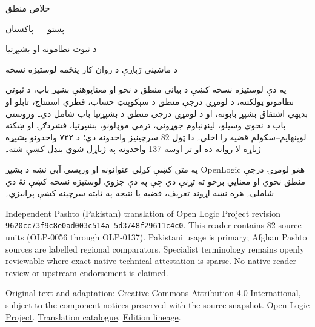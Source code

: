 \documentclass[12pt,a4paper,oneside]{report}
\theoremstyle{definition}
\begin{document}
\setRTL
\begin{titlepage}
\thispagestyle{empty}
\begin{center}
\vspace*{24mm}
{\Huge خلاص منطق}\par\bigskip
{\Large پښتو — پاکستان}\par\bigskip
{\LARGE د ثبوت نظامونه او بشپړتيا}\par\bigskip
د ماشيني ژباړې د روان کار پنځمه لوستيزه نسخه
\end{center}
\bigskip
په دې لوستيزه نسخه کښې د بياني منطق د نحو او معناپوهنې بشپړ باب،
د ثبوتي نظامونو ټولکتنه، د لومړۍ درجې منطق د سېکوېنټ حساب، فطري
استنتاج، تابلو او بديهي اشتقاق بشپړ بابونه، او د لومړۍ درجې منطق د
بشپړتيا باب شامل دي۔ وروستی باب د نحوي وسيلو، لينډنباوم جوړونې، ترمي
موډلونو، بشپړتيا، فشردګۍ او ښکته لوېنهايم–سکولم قضيه را اخلي۔ دا ټول
82 سرچينيز واحدونه دي؛ د ۷۲۲ واحدونو بشپړه ژباړه لا
روانه ده او تر اوسه 137 واحدونه په ژباړل شوي بنډل کښې
شته۔

په متن کښې کږلي عنوانونه او ورپسې آبي \LR{\latinfont [OLP]} نښه د
بشپړ OpenLogic هغو لومړۍ درجې منطق نحوي او معنايي برخو ته تړنې دي چې
په دې جزوي لوستيزه نسخه کښې نۀ دي شاملې۔ هره نښه اړوند تعريف، قضيه
يا نتيجه په ثابته سرچينه کښې پرانيزي۔

\begin{LTR}\latinfont\small
Independent Pashto (Pakistan) translation of Open Logic Project revision
\texttt{9620cc73\allowbreak f9c8e0ad\allowbreak 003c514a\allowbreak
5d3748f2\allowbreak 9611c4c0}. This reader contains
82 source units (OLP-0056 through OLP-0137). Pakistani usage is
primary; Afghan Pashto sources are labelled regional comparators. Specialist
terminology remains openly reviewable where exact native technical attestation
is sparse. No native-reader review or upstream endorsement is claimed.

Original text and adaptation: Creative Commons Attribution 4.0 International,
subject to the component notices preserved with the source snapshot.
\href{https://openlogicproject.org/}{Open Logic Project}.\quad
\href{https://github.com/KokunoYumeto/OpenLogic-translations}{Translation catalogue}.\quad
\href{https://doi.org/10.5281/zenodo.22307197}{Edition lineage}.
\end{LTR}
\end{titlepage}
\tableofcontents
\clearpage


\label{olpseg:OLP-0056-B004:start}
\label{olpseg:OLP-0056-B004:end}
\end{document}
